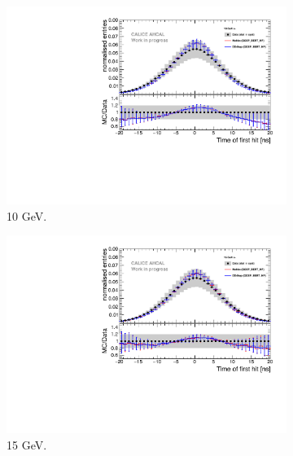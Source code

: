 \begin{figure}[htbp!]
	\begin{subfigure}[t]{0.5\textwidth}
		\centering
		\includegraphics[width=1\textwidth]{chap5/fig_AHCAL_timing/Electrons/Comparison_SimData_Electrons10GeV.pdf}
		\caption{10 GeV.}\label{fig:elec_sim_data_10GeV}
	\end{subfigure}
	\hfill
	\begin{subfigure}[t]{0.5\textwidth}
		\centering
		\includegraphics[width=1\textwidth]{chap5/fig_AHCAL_timing/Electrons/Comparison_SimData_Electrons15GeV.pdf}
		\caption{15 GeV.}\label{fig:elec_sim_data_15GeV}
	\end{subfigure}
	\hfill
	\begin{subfigure}[t]{0.5\textwidth}
		\centering

\end{subfigure}
\end{figure}
